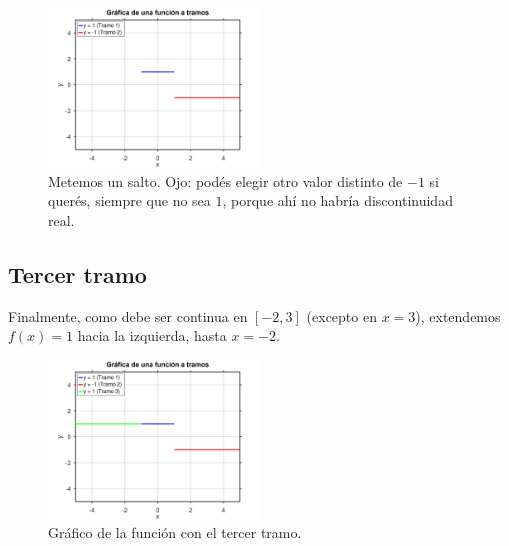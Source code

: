\documentclass[12pt]{article}
\let\oldincludegraphics\includegraphics
\renewcommand{\includegraphics}[2][]{%
  \oldincludegraphics[width=0.5\textwidth,#1]{#2}%
}
\begin{document}
\begin{figure}[H]
  \centering
  \includegraphics{img/segundotramo.png}
  \caption{Metemos un salto. Ojo: podés elegir otro valor distinto de $-1$ si querés, siempre que no sea $1$, porque ahí no habría discontinuidad real.}
\end{figure}

\subsection*{Tercer tramo}
Finalmente, como debe ser continua en $[-2,3]$ (excepto en $x=3$), extendemos $f(x) = 1$ hacia la izquierda, hasta $x=-2$.

\begin{figure}[H]
  \centering
  \includegraphics{img/tercertramo.png}
  \caption{Gráfico de la función con el tercer tramo.}
\end{figure}
\end{document}
